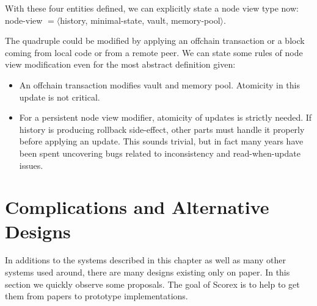 \documentclass[]{report}   %
\begin{document}
With these four entities defined, we can explicitly state a node view type now: node-view $= \langle $history, minimal-state, vault, memory-pool$\rangle$.

The quadruple could be modified by applying an offchain transaction or a block coming from local code
or from a remote peer. We can state some rules of node view  modification even for the most abstract definition given:

\begin{itemize}
\item An offchain transaction modifies vault and memory pool. Atomicity in this update is not critical.

\item For a persistent node view modifier, atomicity of updates is strictly needed. If history is producing rollback side-effect, other parts must handle it properly before applying an update. This sounds trivial, but in fact many years have been spent uncovering bugs related to inconsistency and read-when-update issues.
\end{itemize}




%




\section{Complications and Alternative Designs}
\label{alternatives}
In additions to the systems described in this chapter as well as many other systems used around, there are many designs existing only on paper. In this section we quickly observe some proposals. The goal of Scorex is to help to get them from papers to prototype implementations. 
\end{document}

